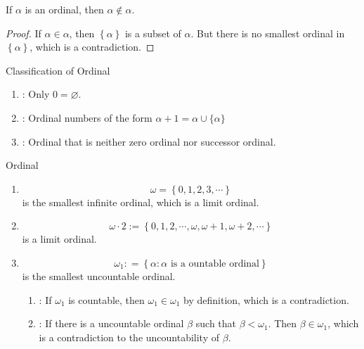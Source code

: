\documentclass[../main.tex]{subfiles}
\begin{document}
\begin{lemma}{}{}
    If \(   \alpha   \) is an ordinal, then \(  \alpha \not \in \alpha   \).  
\end{lemma}
\begin{proof}
    If \(  \alpha \in \alpha   \), then \(  \left\{  \alpha  \right\}  \) is a subset of \(  \alpha   \). But there is no smallest  ordinal in \(  \left\{ \alpha  \right\}  \), which is a contradiction.  
\end{proof}
\begin{definition}{Classification of Ordinal}{}
    \begin{enumerate}
        \item {}: Only \(  0= \varnothing  \). 
        \item  {}: Ordinal numbers of the form $\alpha+1 = \alpha \cup \{\alpha\}$
        \item {}: Ordinal that is neither zero ordinal nor successor ordinal.
    \end{enumerate}
    
\end{definition}

\begin{example}{Ordinal}{}
    \begin{enumerate}
        \item \[
         \omega = \left\{ 0,1,2,3,\cdots  \right\}
        \] is the smallest infinite ordinal, which is a limit ordinal.
        \item \[
         \omega \cdot 2:= \left\{ 0,1,2,\cdots , \omega , \omega + 1, \omega + 2,\cdots  \right\}
        \] is a limit ordinal. 
        \item \[
         \omega _{1}: = \left\{ \alpha :  \alpha  \text{ is a ountable ordinal} \right\}
        \] is the smallest uncountable ordinal. 

        \begin{enumerate}
            \item {}: If \(   \omega _1   \) is countable, then \(   \omega _{1} \in  \omega _{1}  \) by definition,  which is a contradiction.
            \item {}: If there is a uncountable ordinal \(  \beta   \) such that \(  \beta <  \omega _1   \). Then \(  \beta \in  \omega _1   \), which is a contradiction to the uncountability of \(  \beta   \).     
        \end{enumerate}
        
    \end{enumerate}
    
\end{example}
\end{document}
